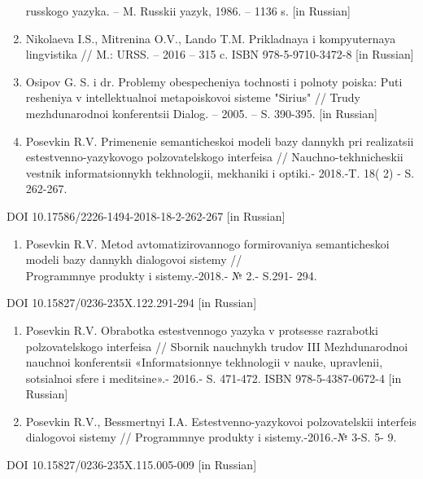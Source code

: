 \begin{noparindent}
\begin{enumerate}
  russkogo yazyka. -- M. Russkii yazyk, 1986. -- 1136 s. {[}in
  Russian{]}
\item
  Nikolaeva I.S., Mitrenina O.V., Lando T.M. Prikladnaya i
  komp\textquotesingle yuternaya lingvistika // M.: URSS. -- 2016 -- 315
  c. ISBN 978-5-9710-3472-8 {[}in Russian{]}
\item
  Osipov G. S. i dr. Problemy obespecheniya tochnosti i polnoty poiska:
  Puti resheniya v intellektual\textquotesingle noi metapoiskovoi
  sisteme "Sirius" // Trudy mezhdunarodnoi konferentsii Dialog. -- 2005.
  -- S. 390-395. {[}in Russian{]}
\item
  Posevkin R.V. Primenenie semanticheskoi modeli bazy dannykh pri
  realizatsii estestvenno-yazykovogo
  pol\textquotesingle zovatel\textquotesingle skogo interfeisa //
  Nauchno-tekhnicheskii vestnik informatsionnykh tekhnologii, mekhaniki
  i optiki.- 2018.-T. 18( 2) - S. 262-267.
\end{enumerate}

DOI 10.17586/2226-1494-2018-18-2-262-267 {[}in Russian{]}

\begin{enumerate}
\def\labelenumi{\arabic{enumi}.}
\setcounter{enumi}{11}
\item
  Posevkin R.V. Metod avtomatizirovannogo formirovaniya semanticheskoi
  modeli bazy dannykh dialogovoi sistemy //\\ Programmnye produkty i
  sistemy.-2018.- № 2.- S.291- 294.
\end{enumerate}

DOI 10.15827/0236-235X.122.291-294 {[}in Russian{]}

\begin{enumerate}
\def\labelenumi{\arabic{enumi}.}
\setcounter{enumi}{12}
\item
  Posevkin R.V. Obrabotka estestvennogo yazyka v protsesse razrabotki
  pol\textquotesingle zovatel\textquotesingle skogo interfeisa //
  Sbornik nauchnykh trudov III Mezhdunarodnoi nauchnoi konferentsii
  «Informatsionnye tekhnologii v nauke, upravlenii,
  sotsial\textquotesingle noi sfere i meditsine».- 2016.- S. 471-472.
  ISBN 978-5-4387-0672-4 {[}in Russian{]}
\item
  Posevkin R.V., Bessmertnyi I.A. Estestvenno-yazykovoi
  pol\textquotesingle zovatel\textquotesingle skii interfeis dialogovoi
  sistemy // Programmnye produkty i sistemy.-2016.-№ 3-S. 5- 9.
\end{enumerate}

DOI 10.15827/0236-235X.115.005-009 {[}in Russian{]}


\end{noparindent}
